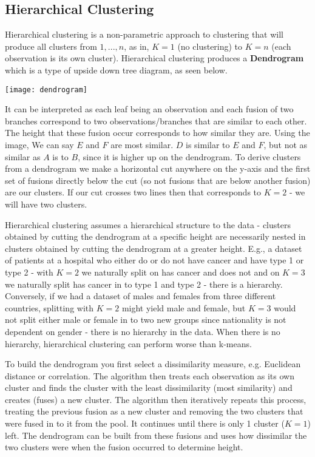 \subsection{Hierarchical Clustering}

Hierarchical clustering is a non-parametric approach to clustering that will produce all clusters from $1,...,n$, as in, $K=1$ (no clustering) to $K=n$ (each observation is its own cluster). Hierarchical clustering produces a \textbf{Dendrogram} which is a type of upside down tree diagram, as seen below.

\texttt{[image: dendrogram]}

It can be interpreted as each leaf being an observation and each fusion of two branches correspond to two observations/branches that are similar to each other. The height that these fusion occur corresponds to how similar they are. Using the image, We can say $E$ and $F$ are most similar. $D$ is similar to $E$ and $F$, but not as similar as $A$ is to $B$, since it is higher up on the dendrogram. To derive clusters from a dendrogram we make a horizontal cut anywhere on the y-axis and the first set of fusions directly below the cut (so not fusions that are below another fusion) are our clusters. If our cut crosses two lines then that corresponds to $K=2$ - we will have two clusters.

Hierarchical clustering assumes a hierarchical structure to the data - clusters obtained by cutting the dendrogram at a specific height are necessarily nested in clusters obtained by cutting the dendrogram at a greater height. E.g., a dataset of patients at a hospital who either do or do not have cancer and have type 1 or type 2 - with $K=2$ we naturally split on has cancer and does not and on $K=3$ we naturally split has cancer in to type 1 and type 2 - there is a hierarchy. Conversely, if we had a dataset of males and females from three different countries, splitting with $K=2$ might yield male and female, but $K=3$ would not split either male or female in to two new groups since nationality is not dependent on gender - there is no hierarchy in the data. When there is no hierarchy, hierarchical clustering can perform worse than k-means.

To build the dendrogram you first select a dissimilarity measure, e.g. Euclidean distance or correlation. The algorithm then treats each observation as its own cluster and finds the cluster with the least dissimilarity (most similarity) and creates (fuses) a new cluster. The algorithm then iteratively repeats this process, treating the previous fusion as a new cluster and removing the two clusters that were fused in to it from the pool. It continues until there is only 1 cluster ($K=1$) left. The dendrogram can be built from these fusions and uses how dissimilar the two clusters were when the fusion occurred to determine height.

